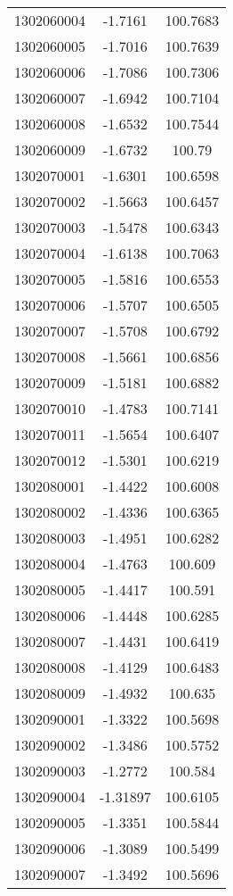 \begin{longtable}[h]{lcc}
		1302060004 & -1.7161 & 100.7683\\ 
		1302060005 & -1.7016 & 100.7639\\ 
		1302060006 & -1.7086 & 100.7306\\ 
		1302060007 & -1.6942 & 100.7104\\ 
		1302060008 & -1.6532 & 100.7544\\ 
		1302060009 & -1.6732 & 100.79\\ 
		1302070001 & -1.6301 & 100.6598\\ 
		1302070002 & -1.5663 & 100.6457\\ 
		1302070003 & -1.5478 & 100.6343\\ 
		1302070004 & -1.6138 & 100.7063\\ 
		1302070005 & -1.5816 & 100.6553\\ 
		1302070006 & -1.5707 & 100.6505\\ 
		1302070007 & -1.5708 & 100.6792\\ 
		1302070008 & -1.5661 & 100.6856\\ 
		1302070009 & -1.5181 & 100.6882\\ 
		1302070010 & -1.4783 & 100.7141\\ 
		1302070011 & -1.5654 & 100.6407\\ 
		1302070012 & -1.5301 & 100.6219\\ 
		1302080001 & -1.4422 & 100.6008\\ 
		1302080002 & -1.4336 & 100.6365\\ 
		1302080003 & -1.4951 & 100.6282\\ 
		1302080004 & -1.4763 & 100.609\\ 
		1302080005 & -1.4417 & 100.591\\ 
		1302080006 & -1.4448 & 100.6285\\ 
		1302080007 & -1.4431 & 100.6419\\ 
		1302080008 & -1.4129 & 100.6483\\ 
		1302080009 & -1.4932 & 100.635\\ 
		1302090001 & -1.3322 & 100.5698\\ 
		1302090002 & -1.3486 & 100.5752\\ 
		1302090003 & -1.2772 & 100.584\\ 
		1302090004 & -1.31897 & 100.6105\\ 
		1302090005 & -1.3351 & 100.5844\\ 
		1302090006 & -1.3089 & 100.5499\\ 
		1302090007 & -1.3492 & 100.5696\\ 

\end{longtable}
